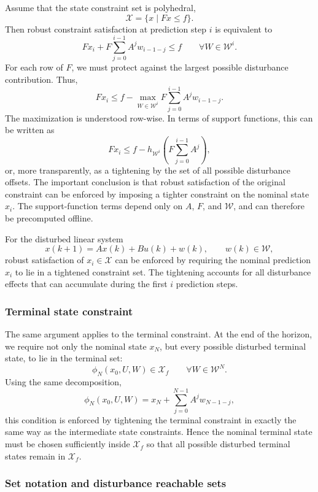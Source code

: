 Assume that the state constraint set is polyhedral,
\[
    \mathcal X=\{x\mid Fx\leq f\}.
\]
Then robust constraint satisfaction at prediction step \(i\) is equivalent to
\[
    F x_i
    +
    F\sum_{j=0}^{i-1}A^j w_{i-1-j}
    \leq f
    \qquad
    \forall W\in\mathcal W^i.
\]
For each row of \(F\), we must protect against the largest possible disturbance contribution.
Thus,
\[
    F x_i
    \leq
    f
    -
    \max_{W\in\mathcal W^i}
    F\sum_{j=0}^{i-1}A^j w_{i-1-j}.
\]
The maximization is understood row-wise. In terms of support functions, this can be written as
\[
    F x_i
    \leq
    f
    -
    h_{\mathcal W^i}
    \left(
        F\sum_{j=0}^{i-1}A^j
    \right),
\]
or, more transparently, as a tightening by the set of all possible disturbance offsets. The
important conclusion is that robust satisfaction of the original constraint can be enforced by
imposing a tighter constraint on the nominal state \(x_i\). The support-function terms depend
only on \(A\), \(F\), and \(\mathcal W\), and can therefore be precomputed offline.

\begin{theorembox}
For the disturbed linear system
\[
    x(k+1)=Ax(k)+Bu(k)+w(k),
    \qquad w(k)\in\mathcal W,
\]
robust satisfaction of \(x_i\in\mathcal X\) can be enforced by requiring the nominal prediction
\(x_i\) to lie in a tightened constraint set. The tightening accounts for all disturbance effects
that can accumulate during the first \(i\) prediction steps.
\end{theorembox}

\subsubsection{Terminal state constraint}

The same argument applies to the terminal constraint. At the end of the horizon, we require not
only the nominal state \(x_N\), but every possible disturbed terminal state, to lie in the terminal
set:
\[
    \phi_N(x_0,U,W)\in\mathcal X_f
    \qquad
    \forall W\in\mathcal W^N.
\]
Using the same decomposition,
\[
    \phi_N(x_0,U,W)
    =
    x_N
    +
    \sum_{j=0}^{N-1} A^j w_{N-1-j},
\]
this condition is enforced by tightening the terminal constraint in exactly the same way as the
intermediate state constraints. Hence the nominal terminal state must be chosen sufficiently
inside \(\mathcal X_f\) so that all possible disturbed terminal states remain in
\(\mathcal X_f\).

\subsubsection{Set notation and disturbance reachable sets}

